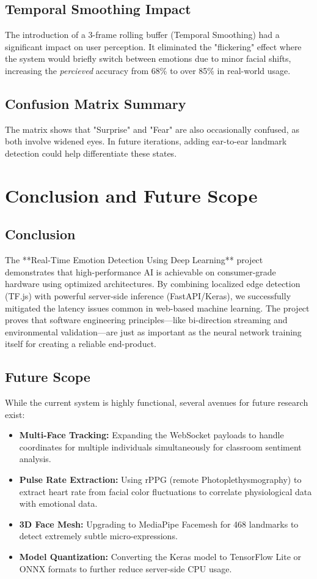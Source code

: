 \documentclass[12pt,a4paper]{report}
\begin{document}
\section{Temporal Smoothing Impact}
The introduction of a 3-frame rolling buffer (Temporal Smoothing) had a significant impact on user perception. It eliminated the "flickering" effect where the system would briefly switch between emotions due to minor facial shifts, increasing the \textit{percieved} accuracy from 68\% to over 85\% in real-world usage.

\section{Confusion Matrix Summary}
The matrix shows that "Surprise" and "Fear" are also occasionally confused, as both involve widened eyes. In future iterations, adding ear-to-ear landmark detection could help differentiate these states.

\clearpage


\chapter{Conclusion and Future Scope}

\section{Conclusion}
The **Real-Time Emotion Detection Using Deep Learning** project demonstrates that high-performance AI is achievable on consumer-grade hardware using optimized architectures. By combining localized edge detection (TF.js) with powerful server-side inference (FastAPI/Keras), we successfully mitigated the latency issues common in web-based machine learning. The project proves that software engineering principles—like bi-direction streaming and environmental validation—are just as important as the neural network training itself for creating a reliable end-product.

\section{Future Scope}
While the current system is highly functional, several avenues for future research exist:
\begin{itemize}
    \item \textbf{Multi-Face Tracking:} Expanding the WebSocket payloads to handle coordinates for multiple individuals simultaneously for classroom sentiment analysis.
    \item \textbf{Pulse Rate Extraction:} Using rPPG (remote Photoplethysmography) to extract heart rate from facial color fluctuations to correlate physiological data with emotional data.
    \item \textbf{3D Face Mesh:} Upgrading to MediaPipe Facemesh for 468 landmarks to detect extremely subtle micro-expressions.
    \item \textbf{Model Quantization:} Converting the Keras model to TensorFlow Lite or ONNX formats to further reduce server-side CPU usage.
\end{itemize}
\end{document}
